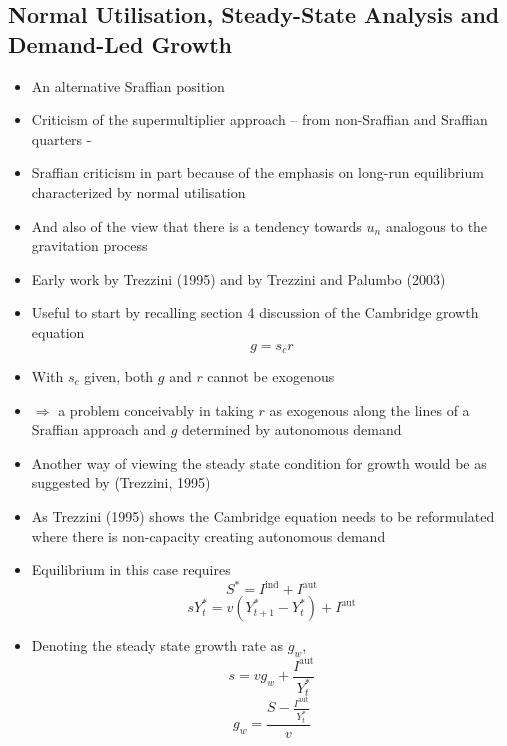 \documentclass[a4paper,twoside]{article}
\numberwithin{equation}{section}
\numberwithin{figure}{section}
\begin{document}
\subsection{Normal Utilisation, Steady-State Analysis and Demand-Led Growth}
	\begin{itemize}
		\item An alternative Sraffian position
		\item Criticism of the supermultiplier approach -- from non-Sraffian and Sraffian quarters -
		\item Sraffian criticism in part because of the emphasis on long-run equilibrium characterized by normal utilisation
		\item And also of the view that there is a tendency towards \( u_n \) analogous to the gravitation process
		\item Early work by Trezzini (1995) and by Trezzini and Palumbo (2003)
		\item Useful to start by recalling section 4 discussion of the Cambridge growth equation
		\[
			g = s_c r
		\]
		\item With \( s_c \) given, both \( g \) and \( r \) cannot be exogenous
		\item \( \Rightarrow \) a problem conceivably in taking \( r \) as exogenous along the lines of a Sraffian approach and \( g \) determined by autonomous demand
		\item Another way of viewing the steady state condition for growth would be as suggested by (Trezzini, 1995)
		\item As Trezzini (1995) shows the Cambridge equation needs to be reformulated where there is non-capacity creating autonomous demand
		\item Equilibrium in this case requires
		\begin{equation}
			S^* = I^\text{ind} + I^\text{aut} \label{E:5.10}
		\end{equation}
		\begin{equation}
			sY_t^* = v \left( Y_{t+1}^* - Y_t^* \right) + I^\text{aut} \label{E:5.11}
		\end{equation}
		\item Denoting the steady state growth rate as \( g_w \),
		\begin{equation}
			s = vg_w + \frac{I^\text{aut}}{Y_t^*} \label{E:5.12}
		\end{equation}
		\begin{equation}
			g_w = \frac{S-\frac{I^\text{aut}}{Y_t^*}}{v} \label{E:5.13}
		\end{equation}

\end{itemize}
\end{document}
